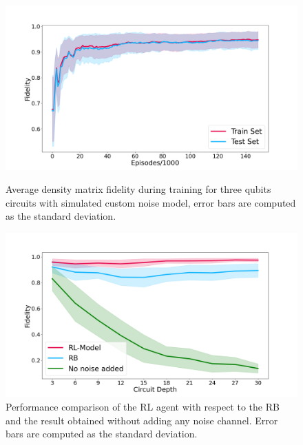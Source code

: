 \documentclass[referee,sn-basic]{sn-jnl} %
\begin{document}
\begin{figure}
    \centering
    \vspace{-8mm}
    \includegraphics[width=\textwidth]{3Q_train_results.png}
    \caption{Average density matrix fidelity during training for three qubits circuits with simulated custom noise model, error bars are computed as the standard deviation.}\label{fig_3q_sim_train}
    \includegraphics[width=\textwidth]{3Q_rb.png}
    \caption{Performance comparison of the RL agent with respect to the RB and the result obtained without adding any noise channel. Error bars are computed as the standard deviation.}\label{fig_3q_sim_bench}
\end{figure}
\end{document}
